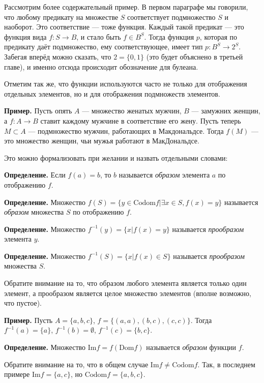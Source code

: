 Рассмотрим более содержательный пример. В первом параграфе мы говорили, что любому предикату на множестве $S$ соответствует подмножество $S$ и наоборот. Это соответствие — тоже функция. Каждый такой предикат — это функция вида $f:S\to B$, и стало быть $f\in B^S$. Тогда функция $p$, которая по предикату даёт подмножество, ему соответствующее, имеет тип $p:B^S \to 2^S$. Забегая вперёд можно сказать, что $2=\{0, 1\}$ (это будет объяснено в третьей главе), и именно отсюда происходит обозначение для булеана.

Отметим так же, что функции используются часто не только для отображения отдельных элементов, но и для отображения подмножеств элементов.

{\bfseries Пример.} Пусть опять $A$ — множество женатых мужчин, $B$ — замужних женщин, а $f: A\to B$ ставит каждому мужчине в соответствие его жену. Пусть теперь $M\subset A$ — подмножество мужчин, работающих в Макдональдсе. Тогда $f(M)$ — это множество женщин, чьи мужья работают в МакДональдсе.

Это можно формализовать при желании и назвать отдельными словами:

{\bfseries Определение.} Если $f(a) = b$, то $b$ называется {\slshape образом} элемента $a$ по отображению $f$.

{\bfseries Определение.} Множество $f(S) = \{y\in \mathrm{Codom}f|\exists x \in S, f(x) = y \}$ называется {\slshape образом} множества $S$ по отображению $f$.

{\bfseries Определение.} Множество $f^{-1}(y) = \{x | f(x) = y \}$ называется {\slshape прообразом} элемента $y$.

{\bfseries Определение.} Множество $f^{-1}(S) = \{x | f(x) \in S \}$ называется {\slshape прообразом} множества $S$.

Обратите внимание на то, что образом любого элемента является только один элемент, а прообразом является целое множество элементов (вполне возможно, что пустое).

{\bfseries Пример.} Пусть $A = \{a, b, c\}$, $f = \{(a, a), (b, c), (c, c)\}$. Тогда $f^{-1}(a) = \{a\}$, $f^{-1}(b) = \emptyset$, $f^{-1}(c) = \{b, c\}$.

{\bfseries Определение.} Множество $\mathrm{Im} f = f(\mathrm{Dom} f)$ называется {\slshape образом} функции $f$.

Обратите внимание на то, что в общем случае $\mathrm{Im} f \not= \mathrm{Codom} f$. Так, в последнем примере $\mathrm{Im} f = \{a, c\}$, но $\mathrm{Codom}f = \{a, b, c\}$.


